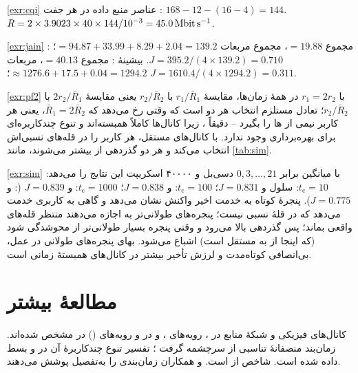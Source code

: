 \documentclass[11pt,a4paper]{article}
\begin{document}
\begin{solutionbox}{\ref{exr:cqi}}
عناصر منبع داده در هر جفت : $168 - 12 - (16-4) = 144$. $R = 2\times3.9023\times40\times144/10^{-3} =
\qty{45.0}{\mega\bit\per\second}$.
\end{solutionbox}

\begin{solutionbox}{\ref{exr:jain}}
: مجموع $=19.88$، مجموع مربعات $=94.87+33.99+8.29+2.04 = 139.2$؛ $J = 395.2/(4\times139.2) = 0.710$.
بیشینهٔ : مجموع $= 40.13$، مربعات $\approx 1276.6+17.5+0.04 = 1294.2$؛ $J = 1610.4/(4\times1294.2) = 0.311$.
\end{solutionbox}

\begin{solutionbox}{\ref{exr:pf2}}
با $r_1 = 2r_2$ در همهٔ زمان‌ها، مقایسهٔ $r_1/\bar R_1$ با $r_2/\bar R_2$ یعنی مقایسهٔ $2r_2/\bar R_1$ با $r_2/\bar R_2$؛
تعادل مستلزم انتخاب هر دو است که وقتی رخ می‌دهد که $\bar R_1 = 2\bar R_2$، یعنی هر کاربر نیمی از ها را
بگیرد -- دقیقاً ، زیرا کانال‌ها کاملاً همبسته‌اند و تنوع چندکاربره‌ای برای بهره‌برداری وجود ندارد. با
کانال‌های مستقل،  هر کاربر را در قله‌های نسبی‌اش انتخاب می‌کند و هر دو گذردهی از  بیشتر می‌شوند،
مانند \cref{tab:sim}.
\end{solutionbox}

\begin{solutionbox}{\ref{exr:sim}}
با میانگین  برابر $0,3,\dots,21$ دسی‌بل و ۴۰۰۰۰  اسکریپت این نتایج را می‌دهد:
$t_\mathrm{c}=10$: سلول  و $J=0.831$؛ $t_\mathrm{c}=100$:  و $J = 0.838$؛
$t_\mathrm{c}=1000$:  و $J=0.839$ (:  و $J=0.775$). پنجرهٔ کوتاه به خدمت اخیر
واکنش نشان می‌دهد و گاهی به کاربری خدمت می‌دهد که در قلهٔ نسبی نیست؛ پنجره‌های طولانی‌تر به  اجازه
می‌دهند منتظر قله‌های واقعی بماند؛ پس گذردهی بالا می‌رود و وقتی پنجره بسیار طولانی‌تر از محوشدگی شود (که اینجا
از  به  مستقل است) اشباع می‌شود. بهای پنجره‌های طولانی در عمل، بی‌انصافی کوتاه‌مدت و لرزش تأخیر
بیشتر در کانال‌های همبستهٔ زمانی است.
\end{solutionbox}

\section{مطالعهٔ بیشتر}
کانال‌های فیزیکی و شبکهٔ منابع در \cite{ts36211}، رویه‌های ،  و  در \cite{ts36213} و
رویه‌های  () در \cite{ts36321} مشخص شده‌اند. زمان‌بند منصفانهٔ تناسبی از 
سرچشمه گرفت \cite{jalali2000hdr}؛ تفسیر تنوع چندکاربرهٔ آن در  و  \cite{tse2005fundamentals}
بسط داده شده است. شاخص  از \cite{jain1984fairness} است.  و همکاران \cite{sesia2011lte} زمان‌بندی
 را به‌تفصیل پوشش می‌دهند.

\begin{latin}
\printbibliography[heading=subbibliography,title={References}]
\end{latin}
\end{document}
